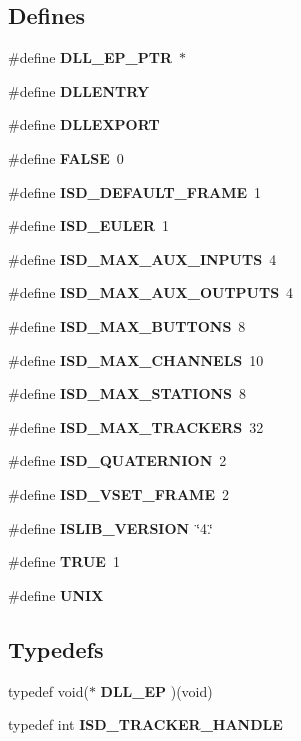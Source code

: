 \subsection*{\-Defines}
\begin{DoxyCompactItemize}
\item 
\#define {\bf \-D\-L\-L\-\_\-\-E\-P\-\_\-\-P\-T\-R}~$\ast$
\item 
\#define {\bf \-D\-L\-L\-E\-N\-T\-R\-Y}
\item 
\#define {\bf \-D\-L\-L\-E\-X\-P\-O\-R\-T}
\item 
\#define {\bf \-F\-A\-L\-S\-E}~0
\item 
\#define {\bf \-I\-S\-D\-\_\-\-D\-E\-F\-A\-U\-L\-T\-\_\-\-F\-R\-A\-M\-E}~1
\item 
\#define {\bf \-I\-S\-D\-\_\-\-E\-U\-L\-E\-R}~1
\item 
\#define {\bf \-I\-S\-D\-\_\-\-M\-A\-X\-\_\-\-A\-U\-X\-\_\-\-I\-N\-P\-U\-T\-S}~4
\item 
\#define {\bf \-I\-S\-D\-\_\-\-M\-A\-X\-\_\-\-A\-U\-X\-\_\-\-O\-U\-T\-P\-U\-T\-S}~4
\item 
\#define {\bf \-I\-S\-D\-\_\-\-M\-A\-X\-\_\-\-B\-U\-T\-T\-O\-N\-S}~8
\item 
\#define {\bf \-I\-S\-D\-\_\-\-M\-A\-X\-\_\-\-C\-H\-A\-N\-N\-E\-L\-S}~10
\item 
\#define {\bf \-I\-S\-D\-\_\-\-M\-A\-X\-\_\-\-S\-T\-A\-T\-I\-O\-N\-S}~8
\item 
\#define {\bf \-I\-S\-D\-\_\-\-M\-A\-X\-\_\-\-T\-R\-A\-C\-K\-E\-R\-S}~32
\item 
\#define {\bf \-I\-S\-D\-\_\-\-Q\-U\-A\-T\-E\-R\-N\-I\-O\-N}~2
\item 
\#define {\bf \-I\-S\-D\-\_\-\-V\-S\-E\-T\-\_\-\-F\-R\-A\-M\-E}~2
\item 
\#define {\bf \-I\-S\-L\-I\-B\-\_\-\-V\-E\-R\-S\-I\-O\-N}~\char`\"{}4.\char`\"{}
\item 
\#define {\bf \-T\-R\-U\-E}~1
\item 
\#define {\bf \-U\-N\-I\-X}
\end{DoxyCompactItemize}
\subsection*{\-Typedefs}
\begin{DoxyCompactItemize}
\item 
typedef void($\ast$ {\bf \-D\-L\-L\-\_\-\-E\-P} )(void)
\item 
typedef int {\bf \-I\-S\-D\-\_\-\-T\-R\-A\-C\-K\-E\-R\-\_\-\-H\-A\-N\-D\-L\-E}
\end{DoxyCompactItemize}

